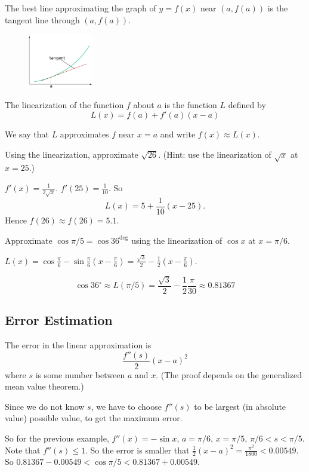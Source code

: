 \documentclass[../main.tex]{subfiles}
\begin{document}
The best line approximating the graph of $y=f(x)$ near $(a, f(a))$ is the tangent line through $(a, f(a))$.

\begin{figure}[H]
  \centering
  \includegraphics[width=0.25\textwidth]{figures/4-7-lin-approx.png}
\end{figure}

The linearization of the function $f$ about $a$ is the function $L$ defined by
\[
  L(x) = f(a) + f'(a)(x-a)
\]

We say that $L$ approximates $f$ near $x=a$ and write $f(x) \approx L(x)$.

\begin{example}
  Using the linearization, approximate $\sqrt{26}$. (Hint: use the linearization of $\sqrt{x}$ at $x=25$.)
\end{example}
\begin{solution}
  $f'(x) = \frac{1}{2\sqrt{x}}$. $f'(25) = \frac{1}{10}$. So
  \[
    L(x) = 5 + \frac{1}{10} (x-25).
  \]
  Hence $f(26) \approx f(26) = 5.1$.
\end{solution}

\begin{example}
  Approximate $\cos \pi/5 = \cos 36^{\deg}$ using the linearization of $\cos x$ at $x=\pi/6$.
\end{example}

\begin{solution}
  $L(x) = \cos\frac{\pi}{6} - \sin \frac{\pi}{6}(x-\frac{\pi}{6}) = \frac{\sqrt{3}}{2} - \frac{1}{2}(x-\frac{\pi}{6})$.

  \[
    \cos 36^{\circ} \approx L(\pi/5) = \frac{\sqrt{3}}{2} - \frac{1}{2} \frac{\pi}{30} \approx 0.81367
  \]
\end{solution}

\subsection*{Error Estimation}
The error in the linear approximation is
\[
  \frac{f''(s)}{2}(x-a)^2
\]
where $s$ is some number between $a$ and $x$. (The proof depends on the generalized mean value theorem.)

Since we do not know $s$, we have to choose $f''(s)$ to be largest (in absolute value) possible value, to get the maximum error.

So for the previous example, $f''(x) = -\sin x$, $a=\pi/6$, $x=\pi/5$, $\pi/6<s<\pi/5$. Note that $f''(s) \le 1$. So the error is smaller that $\frac{1}{2}(x-a)^2 = \frac{\pi^2}{1800}<0.00549$. So $0.81367 -0.00549 < \cos \pi/5 < 0.81367 + 0.00549$.
\end{document}

